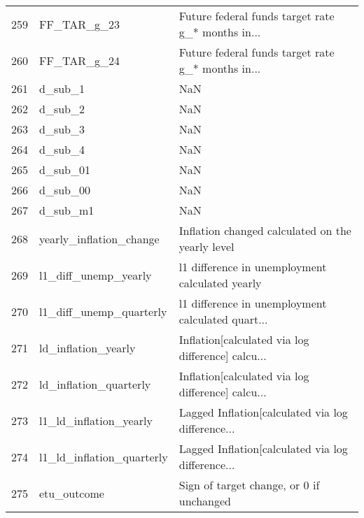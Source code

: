 \begin{tabular}{lll}
259 &                FF\_TAR\_g\_23 &  Future federal funds target rate g\_* months in... \\
260 &                FF\_TAR\_g\_24 &  Future federal funds target rate g\_* months in... \\
261 &                    d\_sub\_1 &                                                NaN \\
262 &                    d\_sub\_2 &                                                NaN \\
263 &                    d\_sub\_3 &                                                NaN \\
264 &                    d\_sub\_4 &                                                NaN \\
265 &                   d\_sub\_01 &                                                NaN \\
266 &                   d\_sub\_00 &                                                NaN \\
267 &                   d\_sub\_m1 &                                                NaN \\
268 &    yearly\_inflation\_change &   Inflation changed calculated on the yearly level \\
269 &       l1\_diff\_unemp\_yearly &    l1 difference in unemployment calculated yearly \\
270 &    l1\_diff\_unemp\_quarterly &  l1 difference in unemployment calculated quart... \\
271 &        ld\_inflation\_yearly &  Inflation[calculated via log difference] calcu... \\
272 &     ld\_inflation\_quarterly &  Inflation[calculated via log difference] calcu... \\
273 &     l1\_ld\_inflation\_yearly &  Lagged Inflation[calculated via log difference... \\
274 &  l1\_ld\_inflation\_quarterly &  Lagged Inflation[calculated via log difference... \\
275 &                etu\_outcome &           Sign of target change, or 0 if unchanged \\
\bottomrule
\end{tabular}

